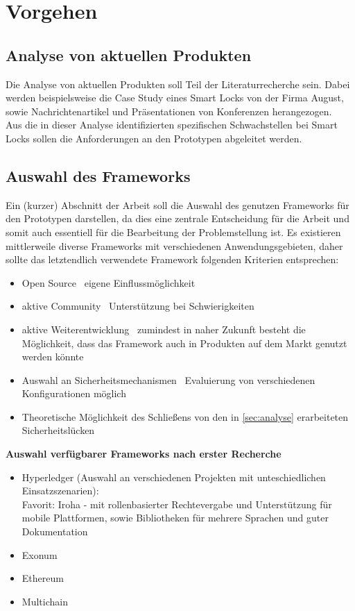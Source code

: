 \section*{Vorgehen}
    \subsection*{Analyse von aktuellen Produkten}
    \label{sec:analyse}
        Die Analyse von aktuellen Produkten soll Teil der Literaturrecherche sein. 
        Dabei werden beispielsweise die Case Study eines Smart Locks von der Firma August\cite{Ye2017}, sowie Nachrichtenartikel\cite{Tsing2017} und Präsentationen von Konferenzen\cite{Rose2016} herangezogen.\\
        \noindent Aus die in dieser Analyse identifizierten spezifischen Schwachstellen bei Smart Locks sollen die Anforderungen an den Prototypen abgeleitet werden.
    
    \subsection*{Auswahl des Frameworks}
        Ein (kurzer) Abschnitt der Arbeit soll die Auswahl des genutzen Frameworks für den Prototypen darstellen, da dies eine zentrale Entscheidung für die Arbeit und somit auch essentiell für die Bearbeitung der Problemstellung ist.
        Es existieren mittlerweile diverse Frameworks mit verschiedenen Anwendungsgebieten, daher sollte das letztendlich verwendete Framework folgenden Kriterien entsprechen:
        \begin{itemize}
            \item Open Source \textrightarrow\ eigene Einflussmöglichkeit
            \item aktive Community \textrightarrow\ Unterstützung bei Schwierigkeiten
            \item aktive Weiterentwicklung \textrightarrow\ zumindest in naher Zukunft besteht die Möglichkeit, dass das Framework auch in Produkten auf dem Markt genutzt werden könnte
            \item Auswahl an Sicherheitsmechanismen \textrightarrow\ Evaluierung von verschiedenen Konfigurationen möglich
            \item Theoretische Möglichkeit des Schließens von den in \ref{sec:analyse} erarbeiteten Sicherheitslücken
        \end{itemize}
        \medskip
        \textbf{Auswahl verfügbarer Frameworks nach erster Recherche}
        \begin{itemize}
            \item Hyperledger (Auswahl an verschiedenen Projekten mit unteschiedlichen Einsatzszenarien):\\
                Favorit: Iroha - mit rollenbasierter Rechtevergabe und Unterstützung für mobile Plattformen, sowie Bibliotheken für mehrere Sprachen und guter Dokumentation
            \item Exonum
            \item Ethereum
            \item Multichain
        \end{itemize}
    

